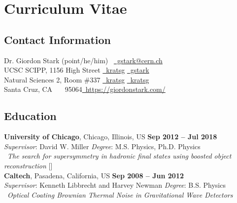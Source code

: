 \chapter{Curriculum Vitae}

\section{Contact Information} \label{sec:contact-information}
{
	\footnotesize
	Dr. Giordon Stark (point/he/him)~                 \hfill \href{mailto:gstark@cern.ch}{~gstark@cern.ch}
	\vspace{0mm}\\\vspace{0mm}%
	UCSC SCIPP, 1156 High Street  \hfill \href{https://github.com/kratsg}{~kratsg} {\color{red!75!black!50}\large\rmfamily\textbullet} \href{{https://gitlab.cern.ch/gstark}}{~gstark}
	\vspace{0mm}\\\vspace{0mm}%
	Natural Sciences 2, Room \#337       \hfill \href{{https://instagram.com/stark_baked}}{~kratsg} {\color{red!75!black!50}\large\rmfamily\textbullet} \href{skype:kratsg?chat}{~kratsg}
	\vspace{0mm}\\\vspace{0mm}%
	Santa Cruz, CA \ \ \ 95064\hfill\href{https://giordonstark.com/?utm_source=cv}{~https://giordonstark.com/}
}

\vspace{-2.0em}\section{Education} \label{sec:education}
{
	\footnotesize
	\textbf{University of Chicago}, Chicago, Illinois, US \hfill \textbf{Sep 2012 -- Jul 2018}\\
	\textsl{Supervisor}: David W. Miller \hfill \textsl{Degree}: M.S. Physics, Ph.D. Physics\\
	\href{https://kratsg.github.io/thesis/?utm_source=cv}{}~\textsl{The search for supersymmetry in hadronic final states using boosted object reconstruction} [\href{https://books.google.com/books?vid=ISBN978-3-030-34548-8}{}]\\
	\textbf{Caltech}, Pasadena, California, US \hfill \textbf{ Sep 2008 -- Jun 2012}\\
	\textsl{Supervisor}: Kenneth Libbrecht and Harvey Newman \hfill \textsl{Degree}: B.S. Physics\\
	\href{https://www.dropbox.com/s/h0mpop96cn563bq/Thesis.pdf?dl=0}{}~\textsl{Optical Coating Brownian Thermal Noise in Gravitational Wave Detectors}
}

